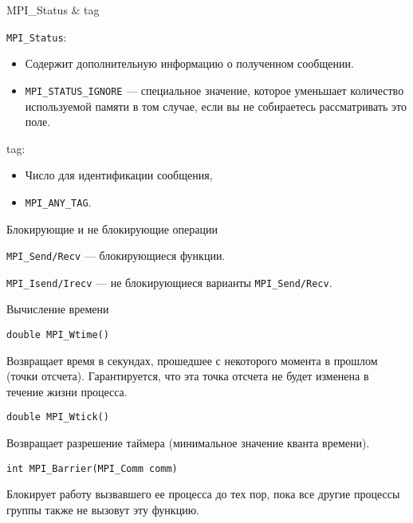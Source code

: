 \begin{frame}{MPI_Status \& tag}

\texttt{MPI_Status}:

\begin{itemize}
    \item Содержит дополнительную информацию о полученном сообщении.
    \item \texttt{MPI_STATUS_IGNORE} --- специальное значение, которое уменьшает количество используемой памяти в том случае, если вы не собираетесь рассматривать это поле.
\end{itemize}

\vfill

tag:

\begin{itemize}
    \item Число для идентификации сообщения,
    \item \texttt{MPI_ANY_TAG}.
\end{itemize}

\end{frame}

\begin{frame}{Блокирующие и не блокирующие операции}

\texttt{MPI_Send/Recv} --- блокирующиеся функции.

\begin{figure}
\centering
{}
\end{figure}

\texttt{MPI_Isend/Irecv} --- не блокирующиеся варианты \texttt{MPI_Send/Recv}.

\end{frame}

\begin{frame}[fragile]{Вычисление времени}

\begin{lstlisting}
double MPI_Wtime()
\end{lstlisting}

Возвращает время в секундах, прошедшее с  некоторого момента в прошлом (точки отсчета). Гарантируется, что эта точка отсчета не будет изменена в течение жизни процесса.

\begin{lstlisting}
double MPI_Wtick()
\end{lstlisting}

Возвращает разрешение таймера (минимальное значение кванта времени). 

\begin{lstlisting}
int MPI_Barrier(MPI_Comm comm)
\end{lstlisting}

Блокирует работу вызвавшего ее процесса до тех пор, пока все другие процессы группы также не вызовут эту функцию.

\end{frame}

